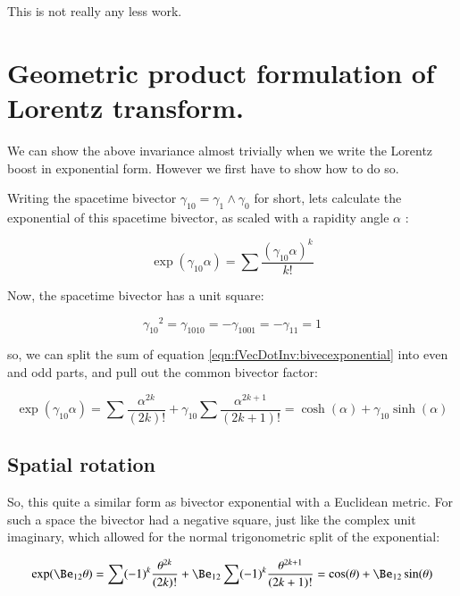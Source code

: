 This is not really any less work.

\section{Geometric product formulation of Lorentz transform. }

We can show the above invariance almost trivially when we write the Lorentz boost in exponential form.  However we first have to show
how to do so.

Writing the spacetime bivector $\gamma_{10} = \gamma_1 \wedge \gamma_0$ for short, lets calculate the exponential of this spacetime bivector, as scaled with a rapidity 
angle $\alpha$ :

\begin{equation}\label{eqn:fVecDotInv:bivecexponential}
\exp(\gamma_{10}\alpha) = \sum \frac{(\gamma_{10}\alpha)^k}{k!}
\end{equation}

Now, the spacetime bivector has a unit square:

\begin{equation*}
{\gamma_{10}}^2 = \gamma_{1010} = -\gamma_{1001} = -\gamma_{11} = 1
\end{equation*}

so, we can split the sum of equation \ref{eqn:fVecDotInv:bivecexponential} into even and odd parts, and pull out the common bivector factor:

\begin{equation}\label{eqn:fVecDotInv:bivechyper}
\exp(\gamma_{10}\alpha) 
= \sum \frac{\alpha^{2k}}{(2k)!} + \gamma_{10}\sum \frac{\alpha^{2k+1}}{(2k+1)!}
= \cosh(\alpha) + \gamma_{10} \sinh(\alpha)
\end{equation}

\subsection{Spatial rotation }

So, this quite a similar form as bivector exponential with a Euclidean metric.  For such a space the bivector had a negative square, just like the complex unit imaginary,
which allowed for the normal trigonometric split of the exponential: 

\begin{equation}
\exp(\Be_{12}\theta) 
= \sum (-1)^k\frac{\theta^{2k}}{(2k)!} + \Be_{12}\sum (-1)^k\frac{\theta^{2k+1}}{(2k+1)!}
= \cos(\theta) + \Be_{12} \sin(\theta)
\end{equation}

